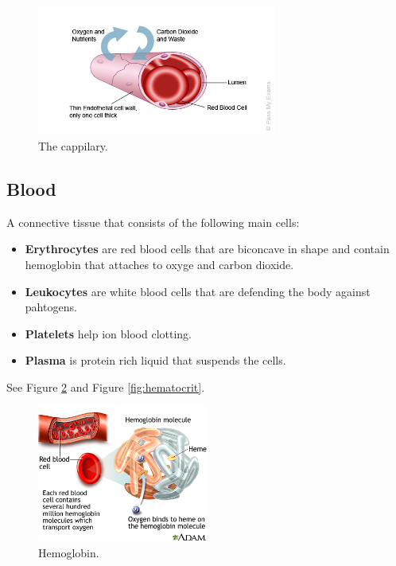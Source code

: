 \documentclass[12pt]{report}
\begin{document}
\begin{figure}[H]
\centering
    \includegraphics[width=0.7\textwidth]{../figures/capillary.jpg}
    \caption{The cappilary.}
    \label{fig:capillary}
\end{figure}

\subsection{Blood}
\begin{definition}[Blood]
    A connective tissue that consists of the following main cells: 
    \begin{itemize}
        \item{ \textbf{Erythrocytes} are red blood cells that are biconcave in shape and contain hemoglobin that attaches to oxyge and carbon dioxide.}
        \item{ \textbf{Leukocytes} are white blood cells that are defending the body against pahtogens.}
        \item{ \textbf{Platelets } help ion blood clotting.}
        \item{ \textbf{Plasma} is protein rich liquid that suspends the cells.}
    \end{itemize}
    See Figure \ref{fig:hemoglobin} and Figure \ref{fig:hematocrit}.
\end{definition}

\begin{figure}[H]
\centering
    \includegraphics[width=0.5\textwidth]{../figures/hemloblogin.jpg}
    \caption{Hemoglobin.}
    \label{fig:hemoglobin}
\end{figure}
\end{document}

